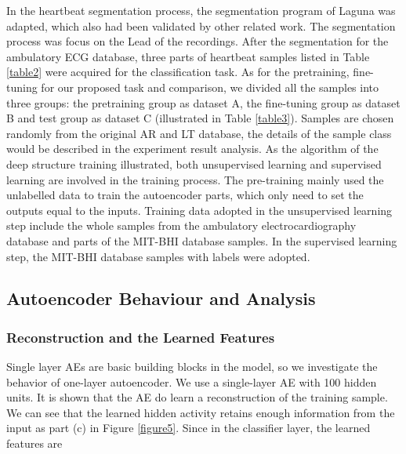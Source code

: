 \documentclass{bmcart}
\begin{document}
In the heartbeat segmentation process, the segmentation program of Laguna \cite{sornmo2006electrocardiogram} was adapted, which also had been validated by other related work\cite{chaza}. The segmentation process was focus on the Lead  \uppercase\expandafter{} of the recordings. After the segmentation for the ambulatory ECG database, three parts of heartbeat samples listed in Table \ref{table2} were acquired for the classification task. As for the pretraining, fine-tuning for our proposed task and comparison, we divided all the samples into three groups: the pretraining group as dataset A, the fine-tuning group as dataset B and test group as dataset C (illustrated in Table \ref{table3}). Samples are chosen randomly from the original AR and LT database, the details of the sample class would be described in the experiment result analysis.
As the algorithm of the deep structure training illustrated, both unsupervised learning and supervised learning are involved in the training process. The pre-training mainly used the unlabelled data to train the autoencoder parts, which only need to set the outputs equal to the inputs. Training data adopted in the unsupervised learning step include the whole samples from the ambulatory electrocardiography database and parts of the MIT-BHI database samples. In the supervised learning step, the MIT-BHI database samples with labels were adopted.

\subsection*{Autoencoder Behaviour and Analysis}
\subsubsection*{Reconstruction and the Learned Features}
Single layer AEs are basic building blocks in the model, so we investigate the behavior of one-layer autoencoder. We use a single-layer AE with 100 hidden units. It is shown that the AE do learn a reconstruction of the training sample. We can see that the learned hidden activity retains enough information from the input as part (c) in Figure \ref{figure5}. Since in the classifier layer, the learned features are 



\end{document}
